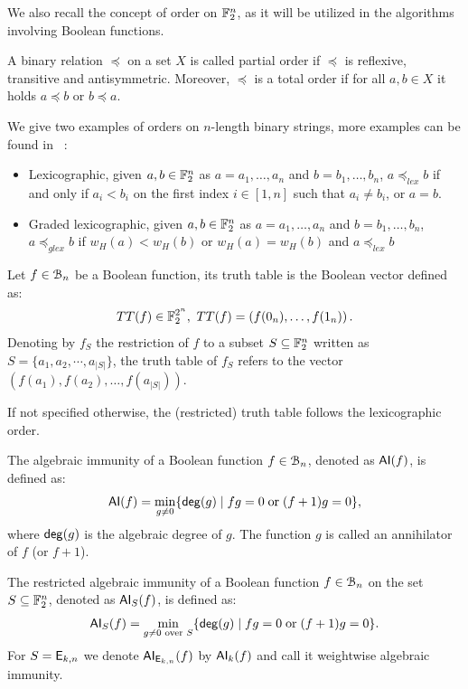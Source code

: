 \documentclass[11pt]{llncs}
\begin{document}
We also recall the concept of order on $\mathbb{F}_2^n$, as it will be utilized in the algorithms involving Boolean functions.


\begin{definition}[Order]\label{def:order}
	A binary relation $\preceq$	on a set $X$ is called partial order if $\preceq$ is reflexive, transitive and antisymmetric. 
	Moreover, $\preceq$ is a total order if for all $a,b\in X$ it holds $a\preceq b$ or $b \preceq a$.
	
\end{definition}

We give two examples of orders on $n$-length binary strings, more examples can be found in \eg~\cite{FUN:SteWil12}:
\begin{itemize}
	\item Lexicographic, given $a,b \in \mathbb{F}_2^n$ as $a=a_1,\ldots, a_n$ and $b=b_1,\ldots,b_n$, $a\preceq_{lex} b$ if and only if  $a_i<b_i$ on the first index $i\in [1,n]$ such that $a_i\ne b_i$, or $a=b$.
	\item Graded lexicographic, given $a,b \in \mathbb{F}_2^n$ as $a=a_1,\ldots, a_n$ and $b=b_1,\ldots,b_n$, $a\preceq_{glex} b$ if $w_H(a) < w_H(b)$ or $w_H(a) = w_H(b)$ and $ a\preceq_{lex}  b$
\end{itemize}




\begin{definition}\label{def:trutthTable}
	Let $f\in \mathcal{B}_{n}$ be a Boolean function, its truth table is the Boolean vector defined as:
\begin{align*}
TT(f) \in \mathbb{F}_2^{2^n},\  TT(f) = \left(f(0_n), \dots, f(1_n)\right).
\end{align*}	
	Denoting by $f_S$ the restriction of $f$ to a subset $S\subseteq \mathbb{F}_2^n$ written as $S = \{a_1, a_2, \cdots, a_{|S|}\}$, the truth table of $f_S$ refers to the vector $\left(f(a_1), f(a_2), \dots, f(a_{|S|})\right)$.

If not specified otherwise, the (restricted) truth table follows the lexicographic order.	
		
\end{definition}



\begin{definition} \label{def:ai}
	The algebraic immunity of a Boolean function $f\in \mathcal{B}_{n}$, denoted as $\mathsf{AI}(f)$, is defined as:
	\[ \mathsf{AI}(f) = \min_{g \neq 0}\{ \mathsf{deg}(g) \; | \; fg = 0 \; \text{or} \; (f + 1)g = 0 \}{,} \]
	where $\mathsf{deg}(g)$ is the algebraic degree of $g$.
	The function $g$ is called an annihilator of $f$ (or $f + 1$). 
	
The restricted algebraic immunity of a Boolean function $f\in \mathcal{B}_{n}$ on the set $S\subseteq \mathbb{F}_2^n$, denoted as $\mathsf{AI}_S(f)$, is defined as:
\[ \mathsf{AI}_S(f) = \min_{g \neq 0 \text{ over } S}\{ \mathsf{deg}(g) \; | \; fg = 0 \; \text{or} \; (f + 1)g = 0 \}{.} \]	
For $S=\mathsf{E}_{k,n}$ we denote $\mathsf{AI}_{\mathsf{E}_{k,n}}(f)$ by $\mathsf{AI}_{k}(f)$ and call it weightwise algebraic immunity.
	
	
\end{definition}
\end{document}
